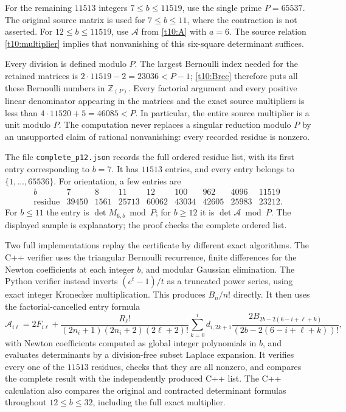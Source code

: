 \documentclass[11pt,letterpaper]{article}
\numberwithin{equation}{section}
\theoremstyle{definition}
\theoremstyle{remark}
\begin{document}
For the remaining $11513$ integers $7\le b\le11519$, use the
single prime $P=65537$. The original source matrix is used for
$7\le b\le11$, where the contraction is not asserted. For
$12\le b\le11519$, use $\mathcal A$ from \eqref{t10:A} with $a=6$.
The source relation \eqref{t10:multiplier} implies that nonvanishing
of this six-square determinant suffices.

Every division is defined modulo $P$. The largest Bernoulli index
needed for the retained matrices is $2\cdot11519-2=23036<P-1$;
\eqref{t10:Brec} therefore puts all these Bernoulli numbers in
$\mathbb Z_{(P)}$. Every factorial argument and every positive
linear denominator appearing in the matrices and the exact source
multipliers is less than $4\cdot11520+5=46085<P$. In particular,
the entire source multiplier is a unit modulo $P$. The computation
never replaces a singular reduction modulo $P$ by an unsupported
claim of rational nonvanishing: every recorded residue is nonzero.

The file \texttt{complete\_p12.json} records the full ordered residue
list, with its first entry corresponding to $b=7$. It has $11513$
entries, and every entry belongs to $\{1,\ldots,65536\}$. For orientation,
a few entries are
\begin{equation}\label{t12:sample}
\begin{array}{c|rrrrrrrr}
 b&7&8&11&12&100&962&4096&11519\\\hline
\text{residue}&39450&1561&25713&60062&43034&42605&25983&23212.
\end{array}
\end{equation}
For $b\le11$ the entry is $\det M_{6,b}\bmod P$;
for $b\ge12$ it is $\det\mathcal A\bmod P$.
The displayed sample is explanatory; the proof checks the complete
ordered list.

Two full implementations replay the certificate by different exact
algorithms. The C++ verifier uses the triangular Bernoulli recurrence,
finite differences for the Newton coefficients at each integer $b$,
and modular Gaussian elimination. The Python verifier instead
inverts $(e^t-1)/t$ as a truncated power series, using exact integer
Kronecker multiplication. This produces $B_n/n!$ directly. It then
uses the factorial-cancelled entry formula
\begin{equation}\label{t12:cancelled-entry}
 \mathcal A_{i\ell}=2F_{i\ell}
 +\frac{R_\ell!}{(2n_i+1)(2n_i+2)(2\ell+2)!}
 \sum_{k=0}^i d_{i,2k+1}
 \frac{2B_{2b-2(6-i+\ell+k)}}{(2b-2(6-i+\ell+k))!},
\end{equation}
with Newton coefficients computed as global integer polynomials
in $b$, and evaluates determinants by a division-free subset
Laplace expansion. It verifies every one of the $11513$ residues,
checks that they are all nonzero, and compares the complete result
with the independently produced C++ list. The C++ calculation also
compares the original and contracted determinant formulas throughout
$12\le b\le32$, including the full exact multiplier.
\end{document}
